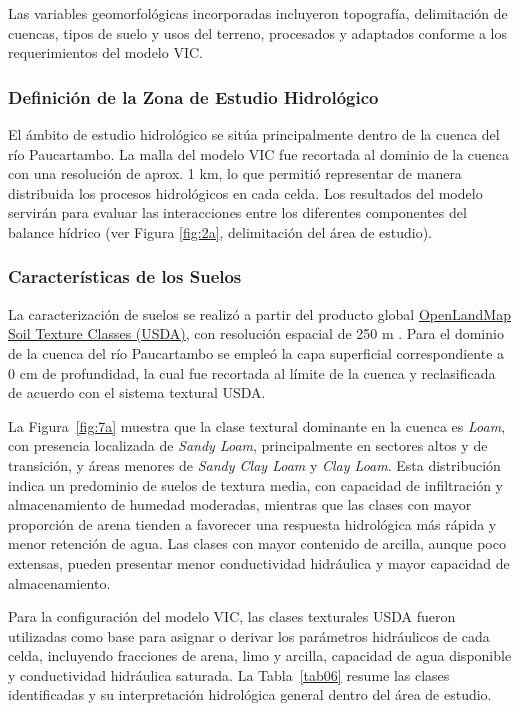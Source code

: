 Las variables geomorfológicas incorporadas incluyeron topografía, delimitación
de cuencas, tipos de suelo y usos del terreno, procesados y adaptados conforme a
los requerimientos del modelo VIC.

\subsubsection{Definición de la Zona de Estudio Hidrológico}

El ámbito de estudio hidrológico se sitúa principalmente dentro de la cuenca del
río Paucartambo. La malla del modelo VIC fue recortada al dominio de la cuenca
con una resolución de aprox. 1 km, lo que permitió representar de manera
distribuida los procesos hidrológicos en cada celda. Los resultados del modelo
servirán para evaluar las interacciones entre los diferentes componentes del
balance hídrico (ver Figura \ref{fig:2a}, delimitación del área de estudio).

\subsubsection{Características de los Suelos}

La caracterización de suelos se realizó a partir del producto global
\href{https://openlandmap.org}{OpenLandMap Soil Texture Classes (USDA)}, con
resolución espacial de 250 m \parencite{hengl2018soiltexture}. Para el dominio
de la cuenca del río Paucartambo se empleó la capa superficial correspondiente a
0 cm de profundidad, la cual fue recortada al límite de la cuenca y
reclasificada de acuerdo con el sistema textural USDA.

La Figura~\ref{fig:7a} muestra que la clase textural dominante en la cuenca es
\textit{Loam}, con presencia localizada de \textit{Sandy Loam}, principalmente
en sectores altos y de transición, y áreas menores de \textit{Sandy Clay Loam}
y \textit{Clay Loam}. Esta distribución indica un predominio de suelos de
textura media, con capacidad de infiltración y almacenamiento de humedad
moderadas, mientras que las clases con mayor proporción de arena tienden a
favorecer una respuesta hidrológica más rápida y menor retención de agua. Las
clases con mayor contenido de arcilla, aunque poco extensas, pueden presentar
menor conductividad hidráulica y mayor capacidad de almacenamiento.

Para la configuración del modelo VIC, las clases texturales USDA fueron
utilizadas como base para asignar o derivar los parámetros hidráulicos de cada
celda, incluyendo fracciones de arena, limo y arcilla, capacidad de agua
disponible y conductividad hidráulica saturada. La Tabla~\ref{tab06} resume las
clases identificadas y su interpretación hidrológica general dentro del área de
estudio.

